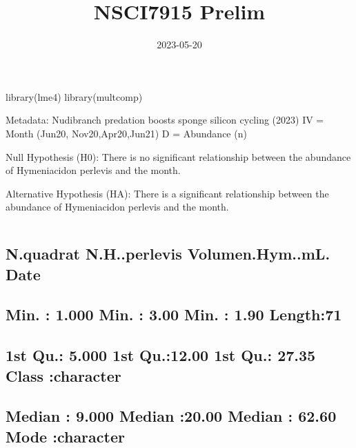 \documentclass[
]{article}
\title{NSCI7915 Prelim}
\author{}
\date{\vspace{-2.5em}2023-05-20}
\newenvironment{Shaded}{\begin{snugshade}}{\end{snugshade}}
\newcommand{\FunctionTok}[1]{\textcolor[rgb]{0.00,0.00,0.00}{#1}}
\newcommand{\NormalTok}[1]{#1}
\begin{document}
\maketitle

\begin{Shaded}
\begin{Highlighting}[]
\FunctionTok{library}\NormalTok{(lme4)}
\FunctionTok{library}\NormalTok{(multcomp)}
\end{Highlighting}
\end{Shaded}

Metadata: Nudibranch predation boosts sponge silicon cycling (2023) IV =
Month (Jun20, Nov20,Apr20,Jun21) D = Abundance (n)

Null Hypothesis (H0): There is no significant relationship between the
abundance of Hymeniacidon perlevis and the month.

Alternative Hypothesis (HA): There is a significant relationship between
the abundance of Hymeniacidon perlevis and the month.

\begin{verbatim}

\end{verbatim}

\hypertarget{n.quadrat-n.h..perlevis-volumen.hym..ml.-date}{%
\subsection{N.quadrat N.H..perlevis Volumen.Hym..mL.
Date}\label{n.quadrat-n.h..perlevis-volumen.hym..ml.-date}}

\hypertarget{min.-1.000-min.-3.00-min.-1.90-length71}{%
\subsection{Min. : 1.000 Min. : 3.00 Min. : 1.90
Length:71}\label{min.-1.000-min.-3.00-min.-1.90-length71}}

\hypertarget{st-qu.-5.000-1st-qu.12.00-1st-qu.-27.35-class-character}{%
\subsection{1st Qu.: 5.000 1st Qu.:12.00 1st Qu.: 27.35 Class
:character}\label{st-qu.-5.000-1st-qu.12.00-1st-qu.-27.35-class-character}}

\hypertarget{median-9.000-median-20.00-median-62.60-mode-character}{%
\subsection{Median : 9.000 Median :20.00 Median : 62.60 Mode
:character}\label{median-9.000-median-20.00-median-62.60-mode-character}}
\end{document}

